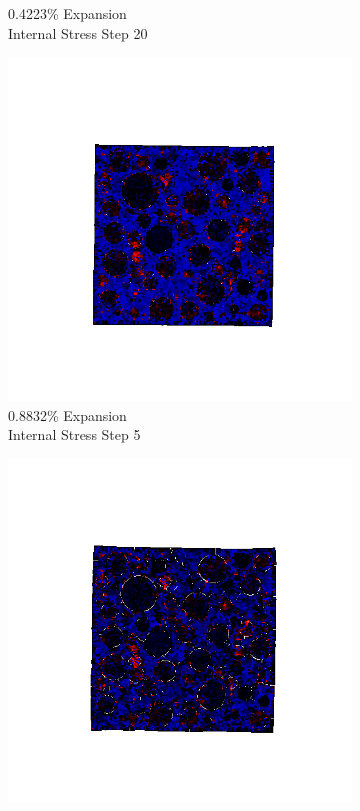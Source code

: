 \begin{figure}[ht!]
\begin{subfigure}{.25\textwidth}
      \caption{0.4223\% Expansion\\Internal Stress Step 20}
    \end{subfigure}

    \begin{subfigure}{.25\textwidth}
      \centering
      \includegraphics[width=1.0\linewidth]{Files/exp_3D/ASR/A30P75_4_s5.png}
      \caption{0.8832\% Expansion\\Internal Stress Step 5}
    \end{subfigure}%
    \begin{subfigure}{.25\textwidth}
      \centering
      \includegraphics[width=1.0\linewidth]{Files/exp_3D/ASR/A30P75_4_s10.png}

\end{subfigure}
\end{figure}

